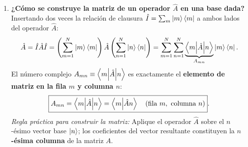 \begin{enumerate}
    \item \textbf{¿Cómo se construye la matriz de un operador $\hat{A}$ en una base dada?}
    Insertando dos veces la relación de clausura $\hat{I} = \sum_m \left| m \right\rangle\left\langle m \right|$ a ambos lados del operador $\hat{A}$:
    \begin{equation}
        \hat{A} = \hat{I}\hat{A}\hat{I} = \left(\sum_{m=1}^N \left| m \right\rangle\left\langle m \right|\right) \hat{A} \left(\sum_{n=1}^N \left| n \right\rangle\left\langle n \right|\right) = \sum_{m=1}^N \sum_{n=1}^N \underbrace{\left\langle m \middle| \hat{A} \middle| n \right\rangle}_{A_{mn}} \left| m \right\rangle\left\langle n \right|.
    \end{equation}
    El número complejo $A_{mn} \equiv \left\langle m \middle| \hat{A} \middle| n \right\rangle$ es exactamente el \textbf{elemento de matriz en la fila $m$ y columna $n$}:
    \begin{equation}
        \boxed{A_{mn} = \left\langle m \middle| \hat{A} \middle| n \right\rangle = \left\langle m \middle| \hat{A}n \right\rangle \quad (\text{fila } m, \text{ columna } n)}.
    \end{equation}
    \textit{Regla práctica para construir la matriz:} Aplique el operador $\hat{A}$ sobre el $n$-ésimo vector base $\left| n \right\rangle$; los coeficientes del vector resultante constituyen la \textbf{$n$-ésima columna} de la matriz $A$.
\end{enumerate}

\begin{table}[H]
    \centering
    \caption{Diccionario de traducción entre el Álgebra Lineal Matricial y la Notación de Dirac.}
    \label{tab:diccionario_dirac}
    \vspace{0.15cm}
\end{table}

